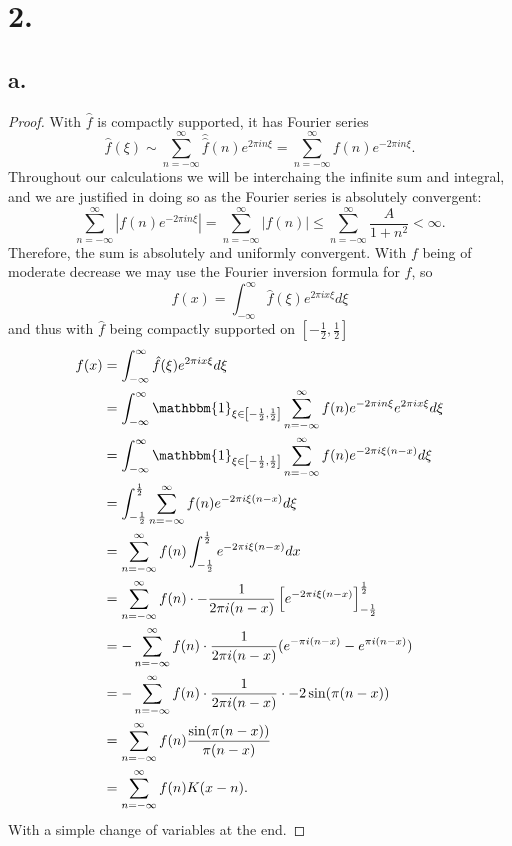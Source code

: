 \documentclass{article}
\begin{document}
\section*{2.}
\subsection*{a.}
\begin{proof}
   With $\hat{f}$ is compactly supported, it has Fourier series
   \[
   \hat{f}(\xi)\sim \sum\limits_{n = -\infty}^{\infty}\hat{\hat{f}}(n)e^{2 \pi i n \xi} = \sum\limits_{n = -\infty}^{\infty}f(n)e^{-2\pi in \xi}. 
   \]
   Throughout our calculations we will be interchaing the infinite sum and integral, and we are justified in doing so as the Fourier series is absolutely convergent:
   \[
    \sum\limits_{n = -\infty}^{\infty}\left|f(n)e^{-2\pi in \xi}\right| = \sum\limits_{n = -\infty}^{\infty}|f(n)| \leq \sum\limits_{n = -\infty}^{\infty} \frac{A}{1 + n^2} < \infty.
   \]
   Therefore, the sum is absolutely and uniformly convergent.  
   With $f$ being of moderate decrease we may use the Fourier inversion formula for $f$, so 
   \[
   f(x) = \int_{-\infty}^{\infty}\hat{f}(\xi)e^{2 \pi i x \xi}d \xi 
   \]
   and thus with $\hat{f}$ being compactly supported on $\left[-\frac{1}{2}, \frac{1}{2}\right]$
   \begin{align*}
    f(x) &= \int_{-\infty}^{\infty}\hat{f}(\xi)e^{2 \pi ix \xi}d \xi \\
    &= \int_{-\infty}^{\infty}\mathbbm{1}_{\xi \in \left[-\frac{1}{2}, \frac{1}{2}\right]}\sum\limits_{n = -\infty}^{\infty}f(n)e^{-2 \pi i n \xi}e^{2 \pi i x \xi}d \xi \\
    &= \int_{-\infty}^{\infty}\mathbbm{1}_{\xi \in \left[-\frac{1}{2}, \frac{1}{2}\right]}\sum\limits_{n = -\infty}^{\infty}f(n)e^{-2 \pi i \xi (n - x)}d \xi \\
    &= \int_{-\frac{1}{2}}^{\frac{1}{2}}\sum\limits_{n = -\infty}^{\infty}f(n)e^{-2 \pi i \xi(n - x)}d\xi \\
    &= \sum\limits_{n = -\infty}^{\infty}f(n)\int_{-\frac{1}{2}}^{\frac{1}{2}}e^{-2 \pi i \xi(n - x)}dx \\
    &= \sum\limits_{n = -\infty}^{\infty}f(n)\cdot -\frac{1}{2 \pi i (n - x)}\left[e^{-2\pi i \xi(n - x)}\right]_{-\frac{1}{2}}^{\frac{1}{2}} \\
    &= - \sum\limits_{n =-\infty}^{\infty}f(n)\cdot \frac{1}{2 \pi i (n - x)}(e^{-\pi i(n - x)} - e^{\pi i(n - x)}) \\
    &= -\sum\limits_{n = -\infty}^{\infty}f(n)\cdot \frac{1}{2 \pi i(n - x)}\cdot -2 \sin(\pi(n - x)) \\
    &= \sum\limits_{n = -\infty}^{\infty}f(n) \frac{\sin(\pi(n - x))}{\pi (n - x)} \\
    &= \sum\limits_{n = -\infty}^{\infty}f(n)K(x - n).
   \end{align*}
   With a simple change of variables at the end. 
\end{proof}   
\end{document}
